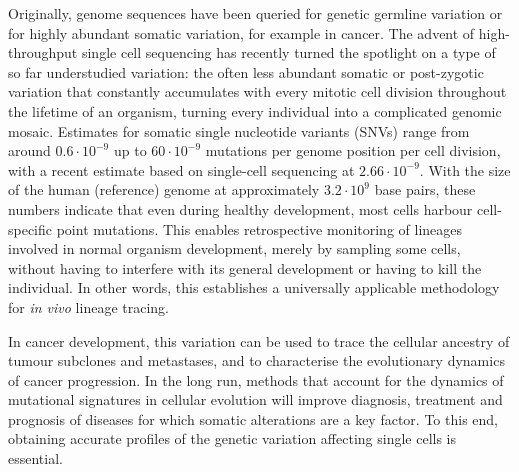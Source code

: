 \documentclass[12pt,inline]{wlscirep}
\begin{document}
Originally, genome sequences have been queried for genetic germline variation or for highly abundant somatic variation, for example in cancer.
The advent of high-throughput single cell sequencing has recently turned the spotlight on a type of so far understudied variation: 
the often less abundant somatic or post-zygotic variation that constantly accumulates with every mitotic cell division throughout the lifetime of an organism, turning every individual into a complicated genomic mosaic\cite{forsberg_mosaicism_2017}.
Estimates for somatic single nucleotide variants (SNVs) range from around $0.6 \cdot 10^{-9}$  up to $60 \cdot 10^{-9}$  mutations per genome position per cell division\cite{lynch_rate_2010,lynch_evolution_2010,tomasetti_half_2013,li_somatic_2013}, with a recent estimate\cite{milholland_differences_2017} based on single-cell sequencing at $2.66 \cdot 10^{-9}$.
With the size of the human (reference) genome at approximately $3.2 \cdot 10^9$ base pairs, these numbers indicate that even during healthy development, most cells harbour cell-specific point mutations.
This enables retrospective monitoring of lineages involved in normal organism development, merely by sampling some cells\cite{kester_single-cell_2018}, without having to interfere with its general development or having to kill the individual.
In other words, this establishes a universally applicable methodology for \textit{in vivo} lineage tracing.

In cancer development, this variation can be used to trace the cellular ancestry of tumour subclones and metastases\cite{ross_onconem:_2016,zafar_sifit:_2017,malikic_integrative_2019,kuipers_advances_2017}, and to characterise the evolutionary dynamics of cancer progression\cite{skums_inference_2019,lahnemann_eleven_2020}.
In the long run, methods that account for the dynamics of mutational signatures in cellular evolution will improve diagnosis, treatment and prognosis of diseases for which somatic alterations are a key factor.
To this end, obtaining accurate profiles of the genetic variation affecting single cells is essential.
\end{document}
